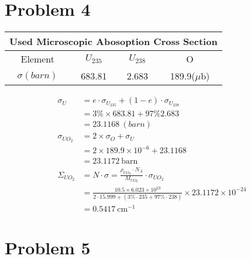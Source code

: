 \documentclass{article}
\begin{document}
\section*{Problem 4}
    \begin{table}[h]
        \centering
        \begin{tabular}{c c c c}
            \multicolumn{4}{c}{Used Microscopic Abosoption Cross Section}\\ \hline \hline
            Element&$U_{235}$ & $U_{238}$& O               \\\hline
            $\sigma(barn)$ & 683.81&   2.683&189.9($\mu$b)                         \\ \hline
        \end{tabular}
    \end{table}
    \begin{align}
        \sigma_U    &= e\cdot \sigma_{U_{235}}+(1-e)\cdot \sigma_{U_{238}} \\
                    &=3\% \times 683.81+97\% 2.683\\
                    &=23.1168\  (barn)                                                  \\
        \sigma_{UO_2}&=2\times \sigma_O + \sigma_U\\\
                    &= 2\times 189.9\times 10^{-6}+ 23.1168\\
                    &=23.1172\ \text{barn}\\
        \Sigma_{UO_2}&=N \cdot \sigma = \frac{\rho_{UO_2} \cdot N_A}{M_{UO_2}}\cdot \sigma_{UO_2}\\
                    &=\frac{10.5\times 6.023\times 10^{23}}{2\cdot15.999+(3\%\cdot 235+97\%\cdot 238)}\times 23.1172\times 10^{-24}\\
                    &=0.5417\ \text{cm}^{-1}
    \end{align}
\section*{Problem 5}
    
\end{document}
